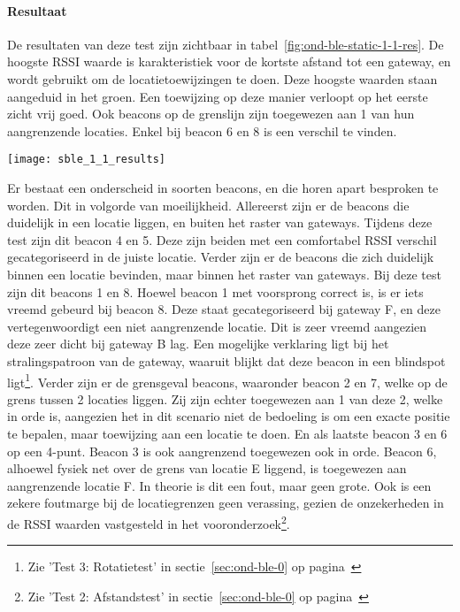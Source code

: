 \paragraph{Resultaat}
\begin{minipage}{0.55\textwidth}
De resultaten van deze test zijn zichtbaar in tabel~\ref{fig:ond-ble-static-1-1-res}. De hoogste RSSI waarde is karakteristiek voor de kortste afstand tot een gateway, en wordt gebruikt om de locatietoewijzingen te doen. Deze hoogste waarden staan aangeduid in het groen. Een toewijzing op deze manier verloopt op het eerste zicht vrij goed. Ook beacons op de grenslijn zijn toegewezen aan 1 van hun aangrenzende locaties. Enkel bij beacon 6 en 8 is een verschil te vinden.
\end{minipage}
\hfill
\begin{minipage}{0.42\textwidth}
	\texttt{[image: sble\_1\_1\_results]}
	\label{fig:ond-ble-static-1-1-res}
\end{minipage}

Er bestaat een onderscheid in soorten beacons, en die horen apart besproken te worden. Dit in volgorde van moeilijkheid. Allereerst zijn er de beacons die duidelijk in een locatie liggen, en buiten het raster van gateways. Tijdens deze test zijn dit beacon 4 en 5. Deze zijn beiden met een comfortabel RSSI verschil gecategoriseerd in de juiste locatie. Verder zijn er de beacons die zich duidelijk binnen een locatie bevinden, maar binnen het raster van gateways. Bij deze test zijn dit beacons 1 en 8. Hoewel beacon 1 met voorsprong correct is, is er iets vreemd gebeurd bij beacon 8. Deze staat gecategoriseerd bij gateway F, en deze vertegenwoordigt een niet aangrenzende locatie.  Dit is zeer vreemd aangezien deze zeer dicht bij gateway B lag. Een mogelijke verklaring ligt bij het stralingspatroon van de gateway, waaruit blijkt dat deze beacon in een blindspot ligt\footnote{Zie 'Test 3: Rotatietest' in sectie~\ref{sec:ond-ble-0} op pagina~\pageref{sec:ond-ble-0}}. Verder zijn er de grensgeval beacons, waaronder beacon 2 en 7, welke op de grens tussen 2 locaties liggen. Zij zijn echter toegewezen aan 1 van deze 2, welke in orde is, aangezien het in dit scenario niet de bedoeling is om een exacte positie te bepalen, maar toewijzing aan een locatie te doen. En als laatste beacon 3 en 6 op een 4-punt. Beacon 3 is ook aangrenzend toegewezen ook in orde. Beacon 6, alhoewel fysiek net over de grens van locatie E liggend, is toegewezen aan aangrenzende locatie F. In theorie is dit een fout, maar geen grote. Ook is een zekere foutmarge bij de locatiegrenzen geen verassing, gezien de onzekerheden in de RSSI waarden vastgesteld in het vooronderzoek\footnote{Zie 'Test 2: Afstandstest' in sectie~\ref{sec:ond-ble-0} op pagina~\pageref{sec:ond-ble-0}}.

